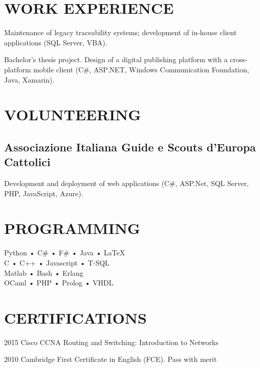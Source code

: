 \documentclass[a4paper]{deedy-resume-openfont}
\begin{document}
\begin{minipage}[t]{0.3\textwidth} 

\section{WORK EXPERIENCE} 

\vspace{\topsep} %
Maintenance of legacy traceability systems; development of in-house client applications (SQL Server, VBA).
\sectionsep

\vspace{\topsep} %
Bachelor's thesis project.
Design of a digital publishing platform with a cross-platform mobile client (C\#, ASP.NET, Windows Communication Foundation, Java, Xamarin).
\sectionsep

\section{VOLUNTEERING}

\subsection{Associazione Italiana Guide e Scouts d'Europa Cattolici}
\vspace{\topsep} %
Development and deployment of web applications
(C\#, ASP.Net, SQL Server, PHP, JavaScript, Azure).
\sectionsep

\section{PROGRAMMING}
Python • C\# • F\# • Java • \LaTeX\ \\
C • C++ • Javascript • T-SQL\\ Matlab • Bash • Erlang \\
OCaml • PHP • Prolog • VHDL
\sectionsep

\section{CERTIFICATIONS} 
\vspace{\topsep} %
\begin{tightemize}
\item[2015]    Cisco CCNA Routing and Switching: Introduction to Networks\\
\item[2010]    Cambridge First Certificate in English (FCE). Pass with merit\\
\end{tightemize}
\sectionsep

\end{minipage} 
\end{document}
